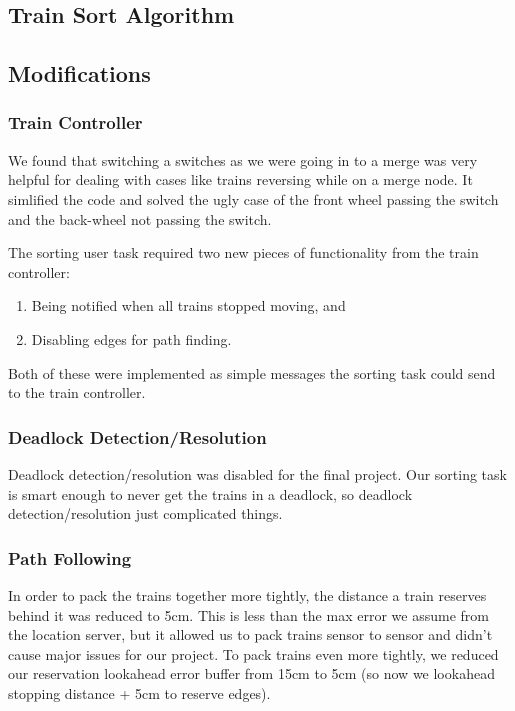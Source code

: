 \documentclass[letterpaper]{article}
\begin{document}
\subsection{Train Sort Algorithm}

\subsection{Modifications}

\subsubsection{Train Controller}

We found that switching a switches as we were going in to a merge was very helpful for dealing with cases like trains reversing while on a merge node. It simlified the code and solved the ugly case of the front wheel passing the switch and the back-wheel not passing the switch.

The sorting user task required two new pieces of functionality from the train controller:

\begin{enumerate}
	\item Being notified when all trains stopped moving, and
	\item Disabling edges for path finding.
\end{enumerate}

Both of these were implemented as simple messages the sorting task could send to the train controller.

\subsubsection{Deadlock Detection/Resolution}

Deadlock detection/resolution was disabled for the final project. Our sorting task is smart enough to never get the trains in a deadlock, so deadlock detection/resolution just complicated things.

\subsubsection{Path Following}

In order to pack the trains together more tightly, the distance a train reserves behind it was reduced to 5cm. This is less than the max error we assume from the location server, but it allowed us to pack trains sensor to sensor and didn't cause major issues for our project. To pack trains even more tightly, we reduced our reservation lookahead error buffer from 15cm to 5cm (so now we lookahead stopping distance + 5cm to reserve edges).
\end{document}
